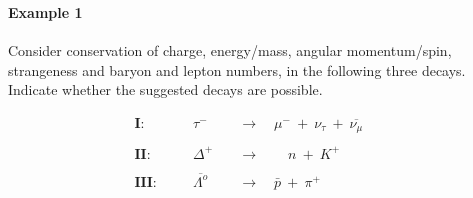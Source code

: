 \begin{frame}
\frametitle{\texorpdfstring{\culine[\sectiontitleulinecolor]{\sectiontitle}}{\sectiontitle} }
%
\framesubtitle{Example 1}

Consider conservation of charge, energy/mass, angular momentum/spin, strangeness and baryon and lepton numbers, in the following three decays. Indicate whether the suggested decays are possible.

$$
\begin{aligned}
\textbf{I:} \quad && \tau^{-} \quad &\rightarrow \quad \mu^{-} ~+~\nu_{\tau} ~+~\overline{\nu_{\mu}}  &&\\
&&  &  &&\\
\textbf{II:}\quad && \Delta^{+} \quad &\rightarrow \quad \quad n~+~K^{+}  &&\\
&&  &  &&\\
\textbf{III:}\quad && \overline{\Lambda^{o}} \quad &\rightarrow \quad \bar{p}~+~\pi^{+}  &&
\end{aligned}
$$



\endofslide 
\end{frame}


